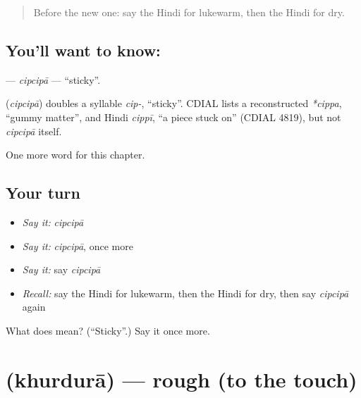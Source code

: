 \label{lesson:HI-C238-cipcipa}



\begin{quote}
Before the new one: say the Hindi for lukewarm, then the Hindi for dry.
\end{quote}

\subsection*{You'll want to know: }
\textbf{} — \emph{cipcipā} — \textquotedblleft{}sticky\textquotedblright{}.

\begin{cousinweb}
\textbf{} (\emph{cipcipā}) doubles a syllable \emph{cip-}, \textquotedblleft{}sticky\textquotedblright{}. CDIAL lists a reconstructed \emph{*cippa}, \textquotedblleft{}gummy matter\textquotedblright{}, and Hindi \emph{cippī}, \textquotedblleft{}a piece stuck on\textquotedblright{} (CDIAL 4819), but not \emph{cipcipā} itself.
\end{cousinweb}

\begin{grammarlens}[title={What you've built}]
One more word for this chapter.
\end{grammarlens}

\subsection*{Your turn}
\begin{itemize}
\raggedright
  \item \emph{Say it:} \emph{cipcipā}
  \item \emph{Say it:} \emph{cipcipā}, once more
  \item \emph{Say it:} say \emph{cipcipā}
  \item \emph{Recall:} say the Hindi for lukewarm, then the Hindi for dry, then say \emph{cipcipā} again
\end{itemize}

\begin{tcolorbox}[breakable,colback=teal!4,colframe=teal!35!black,title={Before you move on}]
What does  mean? (\textquotedblleft{}Sticky\textquotedblright{}.) Say it once more.
\end{tcolorbox}
\section[\texorpdfstring{\hi{खुरदुरा} (khurdurā)}{खुरदुरा (khurdurā)}]{ (khurdurā) — rough (to the touch)}


